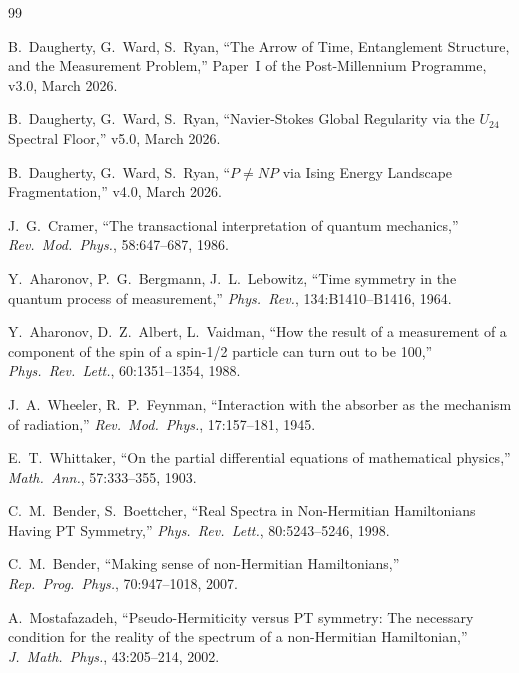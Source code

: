 \documentclass[12pt,a4paper]{article}
\theoremstyle{definition}
\theoremstyle{remark}
\begin{document}
\begin{thebibliography}{99}

 B.~Daugherty, G.~Ward, S.~Ryan, ``The Arrow of Time,
  Entanglement Structure, and the Measurement Problem,'' Paper~I of the
  Post-Millennium Programme, v3.0, March 2026.

 B.~Daugherty, G.~Ward, S.~Ryan, ``Navier-Stokes Global
  Regularity via the $U_{24}$ Spectral Floor,'' v5.0, March 2026.

 B.~Daugherty, G.~Ward, S.~Ryan, ``$P \neq NP$ via Ising
  Energy Landscape Fragmentation,'' v4.0, March 2026.

 J.~G.~Cramer, ``The transactional interpretation of
  quantum mechanics,'' \emph{Rev.\ Mod.\ Phys.}, 58:647--687, 1986.

 Y.~Aharonov, P.~G.~Bergmann, J.~L.~Lebowitz, ``Time
  symmetry in the quantum process of measurement,'' \emph{Phys.\ Rev.},
  134:B1410--B1416, 1964.

 Y.~Aharonov, D.~Z.~Albert, L.~Vaidman, ``How the
  result of a measurement of a component of the spin of a spin-1/2 particle
  can turn out to be 100,'' \emph{Phys.\ Rev.\ Lett.}, 60:1351--1354, 1988.

 J.~A.~Wheeler, R.~P.~Feynman, ``Interaction with the
  absorber as the mechanism of radiation,'' \emph{Rev.\ Mod.\ Phys.},
  17:157--181, 1945.

 E.~T.~Whittaker, ``On the partial differential
  equations of mathematical physics,'' \emph{Math.\ Ann.}, 57:333--355, 1903.

 C.~M.~Bender, S.~Boettcher, ``Real Spectra in
  Non-Hermitian Hamiltonians Having PT Symmetry,'' \emph{Phys.\ Rev.\ Lett.},
  80:5243--5246, 1998.

 C.~M.~Bender, ``Making sense of non-Hermitian
  Hamiltonians,'' \emph{Rep.\ Prog.\ Phys.}, 70:947--1018, 2007.

 A.~Mostafazadeh, ``Pseudo-Hermiticity versus PT
  symmetry: The necessary condition for the reality of the spectrum of a
  non-Hermitian Hamiltonian,'' \emph{J.\ Math.\ Phys.}, 43:205--214, 2002.


\end{thebibliography}
\end{document}
